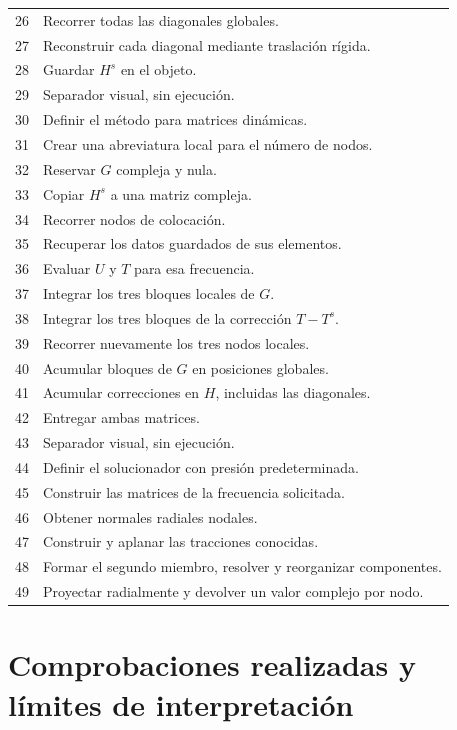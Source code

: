\documentclass[11pt,a4paper]{article}
\numberwithin{equation}{section}
\begin{document}
\begin{longtable}{p{}p{}}
26 & Recorrer todas las diagonales globales.\\
27 & Reconstruir cada diagonal mediante traslaci\'on r\'igida.\\
28 & Guardar $H^s$ en el objeto.\\
29 & Separador visual, sin ejecuci\'on.\\
30 & Definir el m\'etodo para matrices din\'amicas.\\
31 & Crear una abreviatura local para el n\'umero de nodos.\\
32 & Reservar $G$ compleja y nula.\\
33 & Copiar $H^s$ a una matriz compleja.\\
34 & Recorrer nodos de colocaci\'on.\\
35 & Recuperar los datos guardados de sus elementos.\\
36 & Evaluar $U$ y $T$ para esa frecuencia.\\
37 & Integrar los tres bloques locales de $G$.\\
38 & Integrar los tres bloques de la correcci\'on $T-T^s$.\\
39 & Recorrer nuevamente los tres nodos locales.\\
40 & Acumular bloques de $G$ en posiciones globales.\\
41 & Acumular correcciones en $H$, incluidas las diagonales.\\
42 & Entregar ambas matrices.\\
43 & Separador visual, sin ejecuci\'on.\\
44 & Definir el solucionador con presi\'on predeterminada.\\
45 & Construir las matrices de la frecuencia solicitada.\\
46 & Obtener normales radiales nodales.\\
47 & Construir y aplanar las tracciones conocidas.\\
48 & Formar el segundo miembro, resolver y reorganizar componentes.\\
49 & Proyectar radialmente y devolver un valor complejo por nodo.\\
\bottomrule
\end{longtable}

\section{Comprobaciones realizadas y l\'imites de interpretaci\'on}
\label{sec:verificacion}
\end{document}
